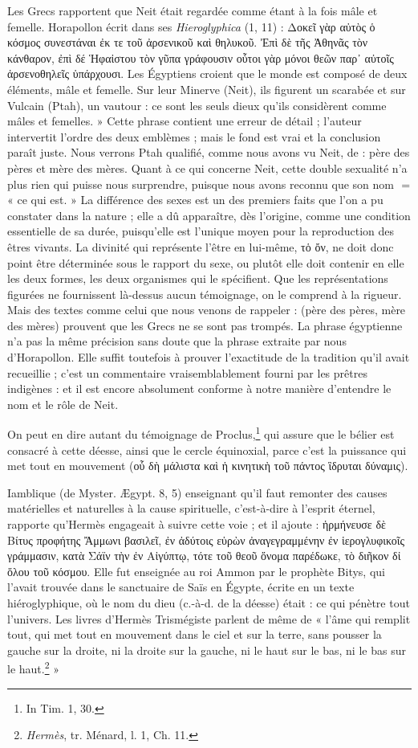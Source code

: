 \documentclass[letterpaper,twocolumn,openany,nodeprecatedcode]{dndbook}
\newcommand*\hieroAAAQ{}
\begin{document}
Les Grecs rapportent que Neit était regardée comme étant à la fois mâle et femelle. Horapollon écrit dans ses \emph{Hieroglyphica} (1, 11) : Δοκεῖ γὰρ αὐτὸς ὁ κόσμος συνεστάναι ἐκ τε τοῦ ἀρσενικοῦ καὶ θηλυκοῦ. Ἐπὶ δὲ τῆς Ἀθηνᾶς τὸν κάνθαρον, ἐπὶ δέ Ἡφαἰστου τὸν γῦπα γράφουσιν οὗτοι γὰρ μόνοι θεῶν παρ᾽ αὐτοῖς ἀρσενοθηλεῖς ὑπάρχουσι. Les Égyptiens croient que le monde est composé de deux éléments, mâle et femelle. Sur leur Minerve (Neit), ils figurent un scarabée et sur Vulcain (Ptah), un vautour : ce sont les seuls dieux qu'ils considèrent comme mâles et femelles. » Cette phrase contient une erreur de détail ; l'auteur intervertit l'ordre des deux emblèmes ; mais le fond est vrai et la conclusion paraît juste. Nous verrons Ptah qualifié, comme nous avons vu Neit, de : père des pères et mère des mères. Quant à ce qui concerne Neit, cette double sexualité n'a plus rien qui puisse nous surprendre, puisque nous avons reconnu que son nom $\hieroAAAQ$ = « ce qui est. » La différence des sexes est un des premiers faits que l'on a pu constater dans la nature ; elle a dû apparaître, dès l'origine, comme une condition essentielle de sa durée, puisqu'elle est l'unique moyen pour la reproduction des êtres vivants. La divinité qui représente l'être en lui-même, τὁ ὄν, ne doit donc point être déterminée sous le rapport du sexe, ou plutôt elle doit contenir en elle les deux formes, les deux organismes qui le spécifient. Que les représentations figurées ne fournissent là-dessus aucun témoignage, on le comprend à la rigueur. Mais des textes comme celui que nous venons de rappeler : (père des pères, mère des mères) prouvent que les Grecs ne se sont pas trompés. La phrase égyptienne n'a pas la même précision sans doute que la phrase extraite par nous d'Horapollon. Elle suffit toutefois à prouver l'exactitude de la tradition qu'il avait recueillie ; c'est un commentaire vraisemblablement fourni par les prêtres indigènes : et il est encore absolument conforme à notre manière d'entendre le nom et le rôle de Neit.

On peut en dire autant du témoignage de Proclus,\footnote{In Tim. 1, 30.} qui assure que le bélier est consacré à cette déesse, ainsi que le cercle équinoxial, parce c'est la puissance qui met tout en mouvement (οὗ δὴ μάλιστα καὶ ἡ κινητικὴ τοῦ πάντος ἳδρυται δύναμις).

Iamblique (de Myster. Ægypt. 8, 5) enseignant qu'il faut remonter des causes matérielles et naturelles à la cause spirituelle, c'est-à-dire à l'esprit éternel, rapporte qu'Hermès engageait à suivre cette voie ; et il ajoute : ἡρμήνευσε δὲ Βίτυς προφήτης Ἄμμωνι βασιλεῖ, ἐν ἀδύτοις εὑρὼν ἀναγεγραμμένην ἐν ἱερογλυφικοῖς γράμμασιν, κατὰ Σάϊν τὴν ἐν Αἰγύπτῳ, τότε τοῦ θεοῦ ὄνομα παρέδωκε, τὸ διῆκον δἰ ὅλου τοῦ κόσμου. Elle fut enseignée au roi Ammon par le prophète Bitys, qui l'avait trouvée dans le sanctuaire de Saïs en Égypte, écrite en un texte hiéroglyphique, où le nom du dieu (c.-à-d. de la déesse) était : ce qui pénètre tout l'univers. Les livres d'Hermès Trismégiste parlent de même de « l'âme qui remplit tout, qui met tout en mouvement dans le ciel et sur la terre, sans pousser la gauche sur la droite, ni la droite sur la gauche, ni le haut sur le bas, ni le bas sur le haut.\footnote{\emph{Hermès}, tr. Ménard, l. 1, Ch. 11.} »
\end{document}
